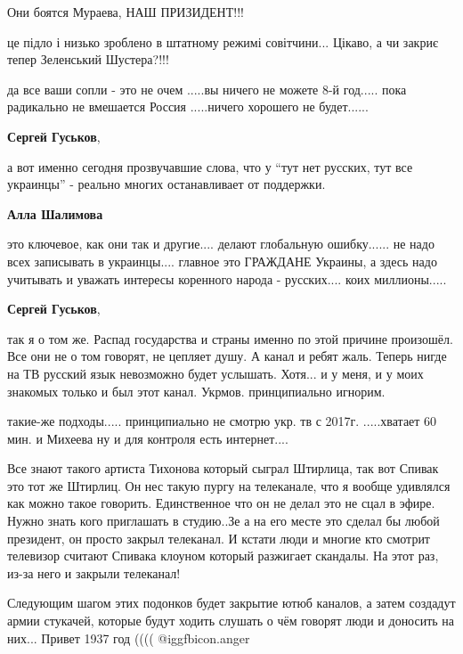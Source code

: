 \begin{itemize}
Они боятся Мураева, НАШ ПРИЗИДЕНТ!!!

це підло і низько зроблено в штатному режимі совітчини... Цікаво, а чи закриє тепер Зеленський Шустера?!!!


да все ваши сопли - это не очем .....вы ничего не можете 8-й год..... пока
радикально не вмешается Россия .....ничего хорошего не будет......

\begin{itemize} %
\textbf{Сергей Гуськов}, 

а вот именно сегодня прозвучавшие слова, что у \enquote{тут нет русских, тут все
украинцы} - реально многих останавливает от поддержки.

\textbf{Алла Шалимова} 

это ключевое, как они так и другие.... делают глобальную ошибку...... не надо
всех записывать в украинцы.... главное это ГРАЖДАНЕ Украины, а здесь надо
учитывать и уважать интересы коренного народа - русских.... коих миллионы.....

\textbf{Сергей Гуськов}, 

так я о том же. Распад государства и страны именно по этой причине произошёл.
Все они не о том говорят, не цепляет душу. А канал и ребят жаль. Теперь нигде
на ТВ русский язык невозможно будет услышать. Хотя... и у меня, и у моих
знакомых только и был этот канал. Укрмов. принципиально игнорим.


такие-же подходы..... принципиально не смотрю укр. тв с 2017г. .....хватает 60
мин. и Михеева ну и для контроля есть интернет....
\end{itemize} %


Все знают такого артиста Тихонова который сыграл Штирлица, так вот Спивак это
тот же Штирлиц. Он нес такую пургу на телеканале, что я вообще удивлялся как
можно такое говорить. Единственное что он не делал это не сцал в эфире. Нужно
знать кого приглашать в студию..Зе а на его месте это сделал бы любой
президент, он просто закрыл телеканал. И кстати люди и многие кто смотрит
телевизор считают Спивака клоуном который разжигает скандалы. На этот раз,
из-за него и закрыли телеканал!


Следующим шагом этих подонков будет закрытие ютюб каналов, а затем создадут
армии стукачей, которые будут ходить слушать о чём говорят люди и доносить на
них... Привет 1937 год (((( @igg{fbicon.anger} 



\end{itemize}
